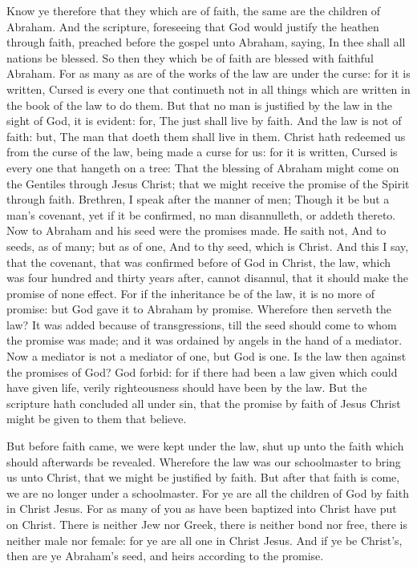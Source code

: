  Know ye therefore that they which are of faith, the same
are the children of Abraham.  And the scripture,
foreseeing that God would justify the heathen through faith, preached
before the gospel unto Abraham, saying, In thee shall all nations be
blessed.  So then they which be of faith are blessed with
faithful Abraham.  For as many as are of the works of the
law are under the curse: for it is written, Cursed is every one that
continueth not in all things which are written in the book of the law to
do them.  But that no man is justified by the law in the
sight of God, it is evident: for, The just shall live by faith.
 And the law is not of faith: but, The man that doeth
them shall live in them.  Christ hath redeemed us from
the curse of the law, being made a curse for us: for it is written,
Cursed is every one that hangeth on a tree:  That the
blessing of Abraham might come on the Gentiles through Jesus Christ;
that we might receive the promise of the Spirit through faith.
 Brethren, I speak after the manner of men; Though it be
but a man's covenant, yet if it be confirmed, no man disannulleth, or
addeth thereto.  Now to Abraham and his seed were the
promises made. He saith not, And to seeds, as of many; but as of one,
And to thy seed, which is Christ.  And this I say, that
the covenant, that was confirmed before of God in Christ, the law, which
was four hundred and thirty years after, cannot disannul, that it should
make the promise of none effect.  For if the inheritance
be of the law, it is no more of promise: but God gave it to Abraham by
promise.  Wherefore then serveth the law? It was added
because of transgressions, till the seed should come to whom the promise
was made; and it was ordained by angels in the hand of a mediator.
 Now a mediator is not a mediator of one, but God is one.
 Is the law then against the promises of God? God forbid:
for if there had been a law given which could have given life, verily
righteousness should have been by the law.  But the
scripture hath concluded all under sin, that the promise by faith of
Jesus Christ might be given to them that believe.

 But before faith came, we were kept under the law, shut
up unto the faith which should afterwards be revealed. 
Wherefore the law was our schoolmaster to bring us unto Christ, that we
might be justified by faith.  But after that faith is
come, we are no longer under a schoolmaster.  For ye are
all the children of God by faith in Christ Jesus.  For as
many of you as have been baptized into Christ have put on Christ.
 There is neither Jew nor Greek, there is neither bond
nor free, there is neither male nor female: for ye are all one in Christ
Jesus.  And if ye be Christ's, then are ye Abraham's
seed, and heirs according to the promise.

